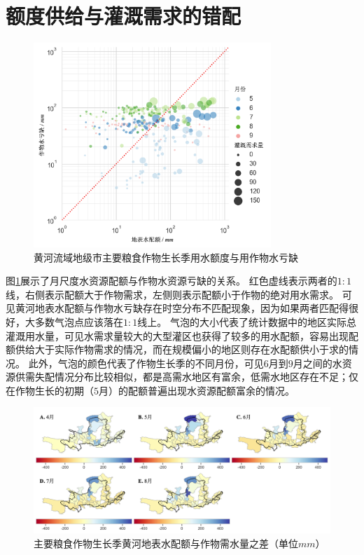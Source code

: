 
\section{额度供给与灌溉需求的错配}

\begin{figure}[htb]
    \centering
    \includegraphics[width=0.8\textwidth]{img/ch6/ch6_matches.png}
    \caption{黄河流域地级市主要粮食作物生长季用水额度与用作物水亏缺}\label{ch6:fig:matches}
\end{figure}

图\ref{ch6:fig:matches}展示了月尺度水资源配额与作物水资源亏缺的关系。
红色虚线表示两者的$1:1$线，右侧表示配额大于作物需求，左侧则表示配额小于作物的绝对用水需求。
可见黄河地表水配额与作物水亏缺存在时空分布不匹配现象，因为如果两者匹配得很好，大多数气泡点应该落在$1:1$线上。
气泡的大小代表了统计数据中的地区实际总灌溉用水量，可见水需求量较大的大型灌区也获得了较多的用水配额，容易出现配额供给大于实际作物需求的情况，而在规模偏小的地区则存在水配额供小于求的情况。
此外，气泡的颜色代表了作物生长季的不同月份，可见$6$月到$9$月之间的水资源供需失配情况分布比较相似，都是高需水地区有富余，低需水地区存在不足；仅在作物生长的初期（$5$月）的配额普遍出现水资源配额富余的情况。

\begin{figure}[htb]
    \centering
    \includegraphics[width=\textwidth]{img/ch6/ch6_deficits_map.png}
    \caption[主要粮食作物生长季黄河地表水配额与作物需水量之差]{主要粮食作物生长季黄河地表水配额与作物需水量之差（单位$mm$）}\label{ch6:fig:deficits_maps}
\end{figure}

